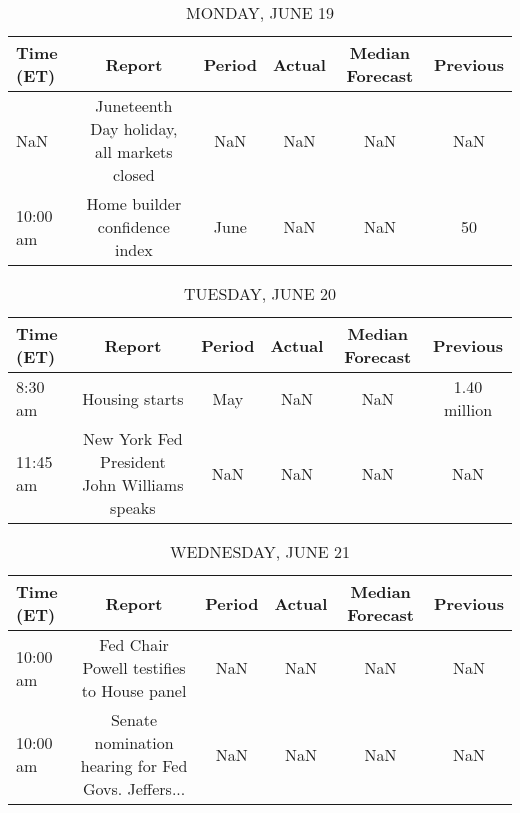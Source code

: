 \documentclass{article}%
\begin{document}
%
\normalsize%


\begin{table}[htbp]%
\caption{MONDAY, JUNE 19}%
\centering%
\begin{adjustbox}{width=1\textwidth}%
\begin{tabular}{lccccc}
\toprule
Time (ET) &                                     Report & Period & Actual & Median Forecast & Previous \\
\midrule
      NaN & Juneteenth Day holiday, all markets closed &    NaN &    NaN &             NaN &      NaN \\
 10:00 am &              Home builder confidence index &   June &    NaN &             NaN &       50 \\
\bottomrule
\end{tabular}
%
\end{adjustbox}%
\end{table}

%


\begin{table}[htbp]%
\caption{TUESDAY, JUNE 20}%
\centering%
\begin{adjustbox}{width=1\textwidth}%
\begin{tabular}{lccccc}
\toprule
Time (ET) &                                      Report & Period & Actual & Median Forecast &     Previous \\
\midrule
  8:30 am &                              Housing starts &    May &    NaN &             NaN & 1.40 million \\
 11:45 am & New York Fed President John Williams speaks &    NaN &    NaN &             NaN &          NaN \\
\bottomrule
\end{tabular}
%
\end{adjustbox}%
\end{table}

%


\begin{table}[htbp]%
\caption{WEDNESDAY, JUNE 21}%
\centering%
\begin{adjustbox}{width=1\textwidth}%
\begin{tabular}{lccccc}
\toprule
Time (ET) &                                             Report & Period & Actual & Median Forecast & Previous \\
\midrule
 10:00 am &          Fed Chair Powell testifies to House panel &    NaN &    NaN &             NaN &      NaN \\
 10:00 am & Senate nomination hearing for Fed Govs. Jeffers... &    NaN &    NaN &             NaN &      NaN \\
\bottomrule
\end{tabular}
%
\end{adjustbox}%
\end{table}
\end{document}
